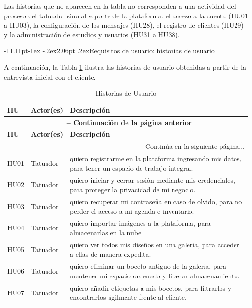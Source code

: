 \documentclass[12pt,letterpaper,oneside]{report}
\makeatletter
\renewcommand\subsection{\@startsection{subsection}{2}{\z@}%
  {-11.11pt\@plus -1ex \@minus -.2ex}{2.06pt \@plus .2ex}{\normalfont\normalsize\bfseries}}
\makeatother
\begin{document}
Las historias que no aparecen en la tabla no corresponden a una actividad del proceso del tatuador sino al soporte de la plataforma: el acceso a la cuenta (HU01 a HU03), la configuración de los mensajes (HU28), el registro de clientes (HU29) y la administración de estudios y usuarios (HU31 a HU38).

\subsection{Requisitos de usuario: historias de usuario}

A continuación, la Tabla \ref{tab:hu} ilustra las historias de usuario obtenidas a partir de la entrevista inicial con el cliente.

\begin{longtable}{|l|p{3.5cm}|p{9.5cm}|}
  \caption{Historias de Usuario} \label{tab:hu}\\
  \hline
  \textbf{HU} & \textbf{Actor(es)} & \textbf{Descripción} \\
  \hline
  \endfirsthead
  \multicolumn{3}{c}{\textbf{\tablename\ \thetable{} -- Continuación de la página anterior}} \\
  \hline
  \textbf{HU} & \textbf{Actor(es)} & \textbf{Descripción} \\
  \hline
  \endhead
  \hline
  \multicolumn{3}{|r|}{Continúa en la siguiente página...} \\
  \hline
  \endfoot
  \hline
  \endlastfoot
  HU01 & Tatuador & quiero registrarme en la plataforma ingresando mis datos, para tener un espacio de trabajo integral. \\ \hline
  HU02 & Tatuador & quiero iniciar y cerrar sesión mediante mis credenciales, para proteger la privacidad de mi negocio. \\ \hline
  HU03 & Tatuador & quiero recuperar mi contraseña en caso de olvido, para no perder el acceso a mi agenda e inventario. \\ \hline
  HU04 & Tatuador & quiero importar imágenes a la plataforma, para almacenarlas en la nube. \\ \hline
  HU05 & Tatuador & quiero ver todos mis diseños en una galería, para acceder a ellas de manera expedita. \\ \hline
  HU06 & Tatuador & quiero eliminar un boceto antiguo de la galería, para mantener mi espacio ordenado y liberar almacenamiento. \\ \hline
  HU07 & Tatuador & quiero añadir etiquetas a mis bocetos, para filtrarlos y encontrarlos ágilmente frente al cliente. \\ \hline

\end{longtable}
\end{document}
